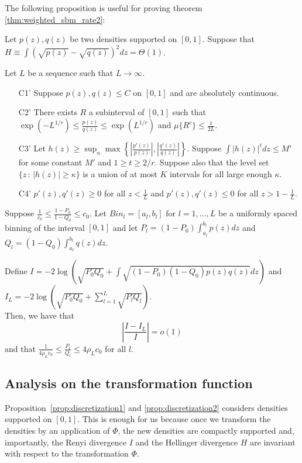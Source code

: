 The following proposition is useful for proving theorem \ref{thm:weighted_sbm_rate2}:

\begin{proposition}
\label{prop:discretization2}
Let $p(z), q(z)$ be two densities supported on $[0,1]$. Suppose that $H \equiv \int (\sqrt{p(z)} - \sqrt{q(z)})^2 dz = \Theta(1)$. 

Let $L$ be a sequence such that $L \rightarrow \infty$.
\begin{enumerate}
\item[C1'] Suppose $p(z), q(z) \leq C$ on $[0,1]$ and are absolutely continuous.
\item[C2'] There exists $R$ a subinterval of $[0,1]$ such that $\exp(-L^{1/r}) \leq \frac{p(z)}{q(z)} \leq \exp(L^{1/r})$ and $\mu\{ R^c \} \leq \frac{1}{2L}$.
\item[C3'] Let $h(z) \geq \sup_n \max \left\{  \left|\frac{p'(z)}{p(z)} \right|, 
 \left|\frac{q'(z)}{q(z)}\right|  \right\} $. Suppose $\int |h(z)|^t dz \leq M'$ for some constant $M'$ and $1 \geq t \geq 2/r$. Suppose also that the level set $\{z \,:\, |h(z)| \geq \kappa\}$ is a union of at most $K$ intervals for all large enough $\kappa$.  
\item[C4']  $p'(z), q'(z) \geq 0$ for all $z < \frac{1}{L}$ and $p'(z), q'(z) \leq 0$ for all $z > 1-\frac{1}{L}$. 
\end{enumerate}


Suppose $\frac{1}{c_0} \leq \frac{1 - P_0}{1-Q_0} \leq c_0$. Let $Bin_l = [a_l, b_l]$ for $l=1,...,L$ be a uniformly spaced binning of the interval $[0,1]$ and let $P_l = (1- P_0) \int_{a_l}^{b_l} p(z) dz$ and $Q_l = (1-Q_0)\int_{a_l}^{b_l} q(z) dz$. 

Define $I = -2 \log \left( \sqrt{P_0 Q_0} + \int \sqrt{(1-P_0)(1-Q_0) p(z) q(z)} dz \right)$ and $I_L = -2 \log \left( \sqrt{P_0 Q_0} + \sum_{l=1}^L \sqrt{P_l Q_l} \right)$. \\

Then, we have that
 $$\left| \frac{I - I_L}{I} \right| = o(1)$$ 
and that $\frac{1}{4\rho_L c_0} \leq \frac{P_l}{Q_l} \leq 4\rho_L c_0$ for all $l$. 
\end{proposition}


\subsection{Analysis on the transformation function}
\label{sec:transformation_analysis}

Proposition~\ref{prop:discretization1} and \ref{prop:discretization2} considers densities supported on $[0,1]$. This is enough for us because once we transform the densities by an application of $\Phi$, the new densities are compactly supported and, importantly, the Renyi divergence $I$ and the Hellinger divergence $H$ are invariant with respect to the transformation $\Phi$.

